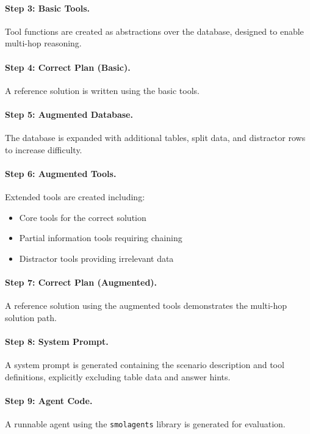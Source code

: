 \documentclass[11pt]{article}
\begin{document}
\paragraph{Step 3: Basic Tools.}
Tool functions are created as abstractions over the database, designed to enable multi-hop reasoning.

\paragraph{Step 4: Correct Plan (Basic).}
A reference solution is written using the basic tools.

\paragraph{Step 5: Augmented Database.}
The database is expanded with additional tables, split data, and distractor rows to increase difficulty.

\paragraph{Step 6: Augmented Tools.}
Extended tools are created including:
\begin{itemize}
    \item Core tools for the correct solution
    \item Partial information tools requiring chaining
    \item Distractor tools providing irrelevant data
\end{itemize}

\paragraph{Step 7: Correct Plan (Augmented).}
A reference solution using the augmented tools demonstrates the multi-hop solution path.

\paragraph{Step 8: System Prompt.}
A system prompt is generated containing the scenario description and tool definitions, explicitly excluding table data and answer hints.

\paragraph{Step 9: Agent Code.}
A runnable agent using the \texttt{smolagents} \citep{smolagents} library is generated for evaluation.
\end{document}

